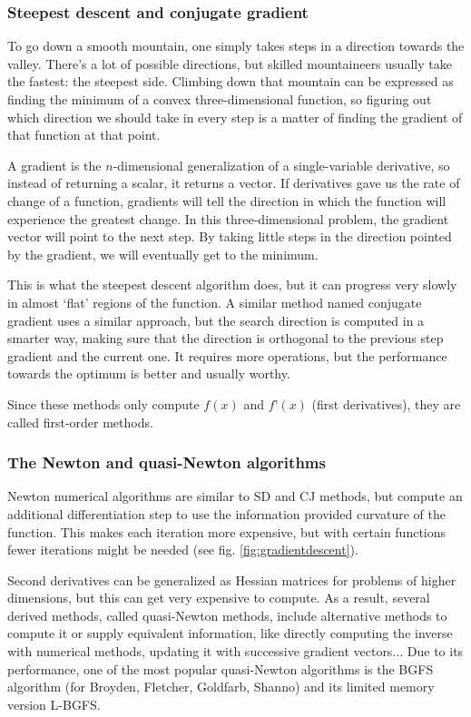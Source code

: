 \subsubsection{Steepest descent and conjugate gradient}
To go down a smooth mountain, one simply takes steps in a direction towards the valley. There’s a lot of possible directions, but skilled mountaineers usually take the fastest: the steepest side. Climbing down that mountain can be expressed as finding the minimum of a convex three-dimensional function, so figuring out which direction we should take in every step is a matter of finding the gradient of that function at that point.

A gradient is the $n$-dimensional generalization of a single-variable derivative, so instead of returning a scalar, it returns a vector. If derivatives gave us the rate of change of a function, gradients will tell the direction in which the function will experience the greatest change. In this three-dimensional problem, the gradient vector will point to the next step. By taking little steps in the direction pointed by the gradient, we will eventually get to the minimum.

This is what the steepest descent algorithm does, but it can progress very slowly in almost ‘flat’ regions of the function. A similar method named conjugate gradient uses a similar approach, but the search direction is computed in a smarter way, making sure that the direction is orthogonal to the previous step gradient and the current one. It requires more operations, but the performance towards the optimum is better and usually worthy.

Since these methods only compute $f(x)$ and $f’(x)$ (first derivatives), they are called first-order methods.

\subsubsection{The Newton and quasi-Newton algorithms}
Newton numerical algorithms are similar to SD and CJ methods, but compute an additional differentiation step to use the information provided curvature of the function. This makes each iteration more expensive, but with certain functions fewer iterations might be needed (see fig. \ref{fig:gradientdescent}).

Second derivatives can be generalized as Hessian matrices for problems of higher dimensions, but this can get very expensive to compute. As a result, several derived methods, called quasi-Newton methods, include alternative methods to compute it or supply equivalent information, like directly computing the inverse with numerical methods, updating it with successive gradient vectors$ \ldots $  Due to its performance, one of the most popular quasi-Newton algorithms is the BGFS algorithm (for Broyden, Fletcher, Goldfarb, Shanno) and its limited memory version L-BGFS.



